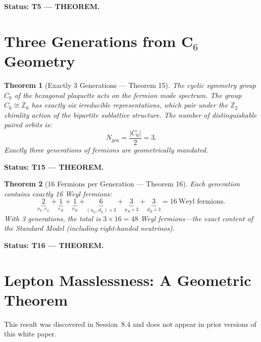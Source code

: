 \documentclass[11pt,letterpaper]{article}
\newtheorem{theorem}{Theorem}[section]
\begin{document}
\textbf{Status: T5 --- THEOREM.}

\section{Three Generations from C$_6$ Geometry}

\begin{theorem}[Exactly 3 Generations --- Theorem 15]\label{thm:T15}
The cyclic symmetry group $C_6$ of the hexagonal plaquette acts on the
fermion mode spectrum.  The group $C_6 \cong \mathbb{Z}_6$ has exactly
six irreducible representations, which pair under the $\mathbb{Z}_2$
chirality action of the bipartite sublattice structure.  The number of
distinguishable paired orbits is:
\begin{equation}
  N_\mathrm{gen} = \frac{|C_6|}{2} = 3.
\end{equation}
Exactly three generations of fermions are geometrically mandated.
\end{theorem}

\textbf{Status: T15 --- THEOREM.}

\begin{theorem}[16 Fermions per Generation --- Theorem 16]\label{thm:T16}
Each generation contains exactly 16 Weyl fermions:
\begin{equation}
  \underbrace{2}_\text{$\nu_L,e_L$}
  + \underbrace{1}_{e_R}
  + \underbrace{1}_{\nu_R}
  + \underbrace{6}_{(u_L,d_L)\times3}
  + \underbrace{3}_{u_R\times3}
  + \underbrace{3}_{d_R\times3}
  = 16~\text{Weyl fermions}.
\end{equation}
With 3 generations, the total is $3\times16 = 48$ Weyl fermions---the
exact content of the Standard Model (including right-handed neutrinos).
\end{theorem}

\textbf{Status: T16 --- THEOREM.}

\section{Lepton Masslessness: A Geometric Theorem}\label{sec:leptonmass}

This result was discovered in Session~8.4 and does not appear in prior
versions of this white paper.
\end{document}
